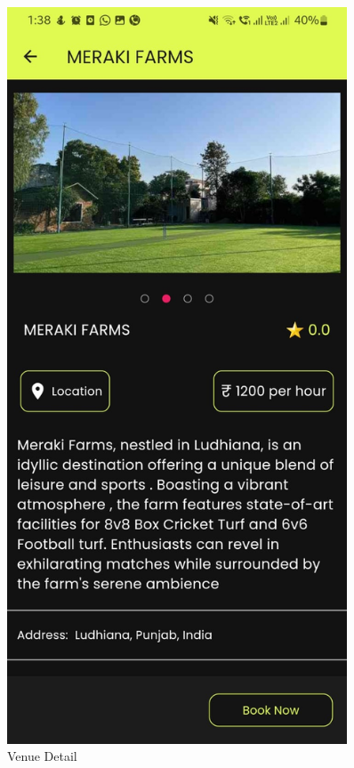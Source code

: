 \documentclass[12pt,a4paper]{report}
\begin{document}
\begin{figure}[H]
    \hfill
    \begin{minipage}[t]{0.3\textwidth}
        \centering
        \includegraphics[width=0.9\textwidth]{assets/screenshot3.jpeg}
        \caption{Venue Detail}
    \end{minipage}


\end{figure}
\end{document}
